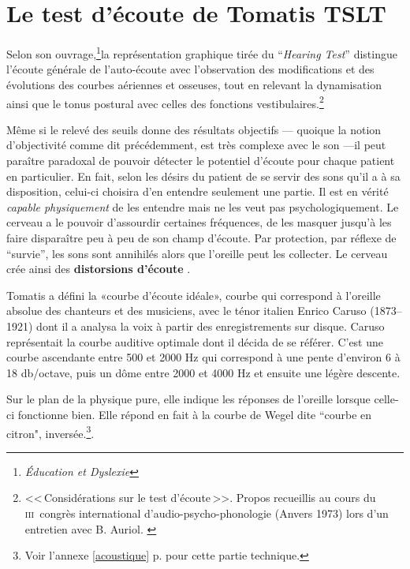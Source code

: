 
\section{ 
  Le test d'écoute de Tomatis TSLT}


Selon son ouvrage,\footnote{\emph{Éducation et
    Dyslexie}\autocite{tomatis:education}}la représentation graphique tirée du 
 ``\emph{Hearing Test}'' distingue l'écoute générale de l'auto-écoute avec l'observation des modifications et des évolutions des courbes
  aériennes et osseuses, tout en relevant la dynamisation 
ainsi que le tonus postural avec celles des fonctions vestibulaires.\footnote{<<\,Considérations sur le test d'écoute\,>>. Propos
  	recueillis au cours du \textsc{iii}\ieme\ congrès international
  	d'audio-psycho-phonologie (Anvers 1973) lors d'un entretien
        avec B. Auriol. \autocite{auriol_stress}}

Même si le relevé des seuils donne des résultats objectifs
--- quoique la notion d'objectivité comme dit précédemment, est très complexe
avec le son ---il peut paraître paradoxal de pouvoir détecter 
le potentiel d'écoute pour
chaque patient en particulier.
En fait, selon les désirs du patient de se servir des sons
qu'il a à sa disposition, celui-ci choisira d'en entendre seulement une
partie. Il est en vérité \textit{capable physiquement} de les entendre
mais ne les veut pas psychologiquement. Le cerveau a le
  pouvoir d'assourdir certaines fréquences, de les masquer jusqu'à les faire disparaître peu à peu de
  son champ d'écoute. Par protection, par réflexe de ``survie'', les sons
  sont
  annihilés alors que  l'oreille peut les collecter. Le
  cerveau crée ainsi des\textbf{ distorsions
  d'écoute} \autocite{tomatis:education}.

  




Tomatis a défini la «courbe d'écoute idéale», courbe qui correspond à l'oreille absolue
des chanteurs et des musiciens,  avec  le ténor italien Enrico
Caruso (1873--1921) dont il a analysa la voix à partir des
enregistrements sur disque. Caruso représentait la courbe auditive
optimale dont il décida de se référer. C'est une courbe ascendante entre 500 et 2000
Hz qui correspond à une pente d\textquoteright environ 6 à 18 db/octave,
puis un dôme entre 2000 et 4000 Hz et ensuite une légère descente. 

      Sur le plan de la physique pure, elle indique les réponses de l'oreille
lorsque celle-ci fonctionne bien. Elle répond en fait à la courbe
de Wegel dite ``courbe en citron", inversée.\footnote{%
		Voir l'annexe \ref{acoustique} p. \pageref{acoustique}
		 pour cette partie technique.}.

